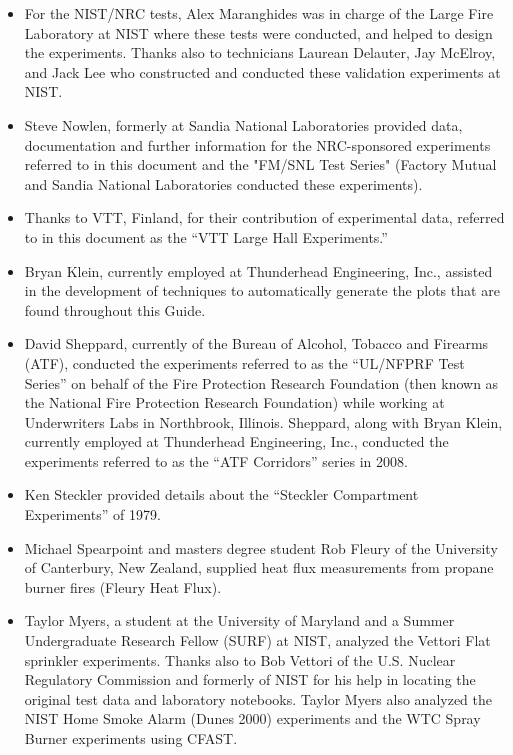 \documentclass[12pt]{book}
\begin{document}
\begin{itemize}
\item For the NIST/NRC tests, Alex Maranghides was in charge of the Large Fire Laboratory at NIST where these tests were conducted, and helped to design the experiments. Thanks also to technicians Laurean Delauter, Jay McElroy, and Jack Lee who constructed and conducted these validation experiments at NIST.

\item Steve Nowlen, formerly at Sandia National Laboratories provided data, documentation and further information for the NRC-sponsored experiments referred to in this document and the "FM/SNL Test Series" (Factory Mutual and Sandia National Laboratories conducted these experiments).

\item Thanks to VTT, Finland, for their contribution of experimental data, referred to in this document as the ``VTT Large Hall Experiments.''

\item Bryan Klein, currently employed at Thunderhead Engineering, Inc., assisted in the development of techniques to automatically generate the plots that are found throughout this Guide.

\item David Sheppard, currently of the Bureau of Alcohol, Tobacco and Firearms (ATF), conducted the experiments referred to as the ``UL/NFPRF Test Series'' on behalf of the Fire Protection Research Foundation (then known as the National Fire Protection Research Foundation) while working at Underwriters Labs in Northbrook, Illinois. Sheppard, along with Bryan Klein, currently employed at Thunderhead Engineering, Inc., conducted the experiments referred to as the ``ATF Corridors'' series in 2008.

\item Ken Steckler provided details about the ``Steckler Compartment Experiments'' of 1979.

\item Michael Spearpoint and masters degree student Rob Fleury of the University of Canterbury, New Zealand, supplied heat flux measurements from propane burner fires (Fleury Heat Flux).

\item Taylor Myers, a student at the University of Maryland and a Summer Undergraduate Research Fellow (SURF) at NIST, analyzed the Vettori Flat sprinkler experiments. Thanks also to Bob Vettori of the U.S. Nuclear Regulatory Commission and formerly of NIST for his help in locating the original test data and laboratory notebooks. Taylor Myers also analyzed the NIST Home Smoke Alarm (Dunes 2000) experiments and the WTC Spray Burner experiments using CFAST.


\end{itemize}
\end{document}
